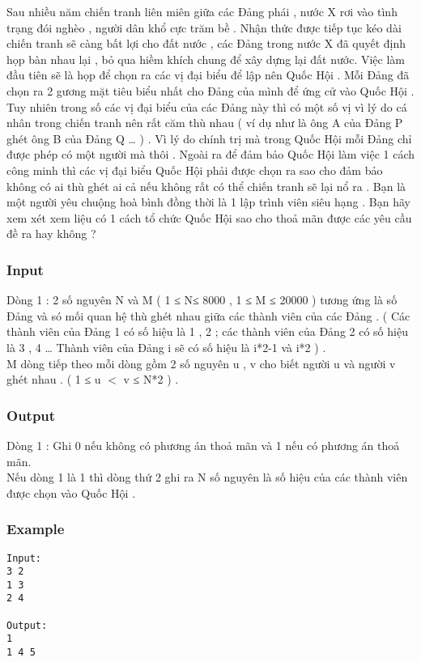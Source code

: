 



   Sau nhiều năm chiến tranh liên miên giữa các Đảng phái , nước X rơi vào tình trạng đói nghèo , người dân khổ cực trăm bề . Nhận thức được tiếp tục kéo dài chiến tranh sẽ càng bất lợi cho đất nước , các Đảng trong nước X đã quyết định họp bàn nhau lại , bỏ qua hiềm khích chung để xây dựng lại đất nước. Việc làm đầu tiên sẽ là họp để chọn ra các vị đại biểu để lập nên Quốc Hội . Mỗi Đảng đã chọn ra 2 gương mặt tiêu biểu nhất cho Đảng của mình để ứng cử vào Quốc Hội . Tuy nhiên trong số các vị đại biểu của các Đảng này thì có một số vị vì lý do cá nhân trong chiến tranh nên rất căm thù nhau ( ví dụ như là ông A của Đảng P ghét ông B của Đảng Q … ) . Vì lý do chính trị mà trong Quốc Hội mỗi Đảng chỉ được phép có một người mà thôi . Ngoài ra để đảm bảo Quốc Hội làm việc 1 cách công minh thì các vị đại biểu Quốc Hội phải được chọn ra sao cho đảm bảo không có ai thù ghét ai cả nếu không rất có thể chiến tranh sẽ lại nổ ra . Bạn là một người yêu chuộng hoà bình đồng thời là 1 lập trình viên siêu hạng . Bạn hãy xem xét xem liệu có 1 cách tổ chức Quốc Hội sao cho thoả mãn được các yêu cầu đề ra hay không ?  

\subsubsection{   Input  }

   Dòng 1 : 2 số nguyên N và M ( 1 ≤ N≤ 8000 , 1 ≤ M ≤ 20000 ) tương ứng là số Đảng và só mối quan hệ thù ghét nhau giữa các thành viên của các Đảng . ( Các thành viên của Đảng 1 có số hiệu là 1 , 2 ; các thành viên của Đảng 2 có số hiệu là 3 , 4 … Thành viên của Đảng i sẽ có số hiệu là i*2-1 và i*2 ) .   
\\   M dòng tiếp theo mỗi dòng gồm 2 số nguyên u , v cho biết người u và người v ghét nhau . ( 1 ≤ u $<$ v ≤ N*2 ) .  

\subsubsection{   Output  }

   Dòng 1 : Ghi 0 nếu không có phương án thoả mãn và 1 nếu có phương án thoả mãn.   
\\   Nếu dòng 1 là 1 thì dòng thứ 2 ghi ra N số nguyên là số hiệu của các thành viên được chọn vào Quốc Hội .  

\subsubsection{   Example  }
\begin{verbatim}
Input:
3 2
1 3
2 4

Output:
1
1 4 5

\end{verbatim}
